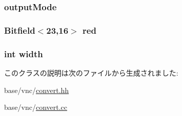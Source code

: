 \label{classVideoConvert_ade2cdeada5ed99044e79b262d445f5e8}
\hypertarget{classVideoConvert_aedb6a520f53eb424c8ad0b2221804c4d}{
\subsubsection[{outputMode}]{ {\bf outputMode}}}
\label{classVideoConvert_aedb6a520f53eb424c8ad0b2221804c4d}
\hypertarget{classVideoConvert_a42c3a4a0281e61ee592e36a3eda020f2}{
\subsubsection[{red}]{}}
\label{classVideoConvert_a42c3a4a0281e61ee592e36a3eda020f2}
\hypertarget{classVideoConvert_ad49a87cd83e7b5cf018907f2ab2ac4b2}{
\subsubsection[{red}]{\setlength{\rightskip}{0pt plus 5cm}Bitfield$<$23,16$>$ {\bf red}}}
\label{classVideoConvert_ad49a87cd83e7b5cf018907f2ab2ac4b2}
\hypertarget{classVideoConvert_a2474a5474cbff19523a51eb1de01cda4}{
\subsubsection[{width}]{\setlength{\rightskip}{0pt plus 5cm}int {\bf width}}}
\label{classVideoConvert_a2474a5474cbff19523a51eb1de01cda4}


このクラスの説明は次のファイルから生成されました:\begin{DoxyCompactItemize}
\item 
base/vnc/\hyperlink{convert_8hh}{convert.hh}\item 
base/vnc/\hyperlink{convert_8cc}{convert.cc}\end{DoxyCompactItemize}

